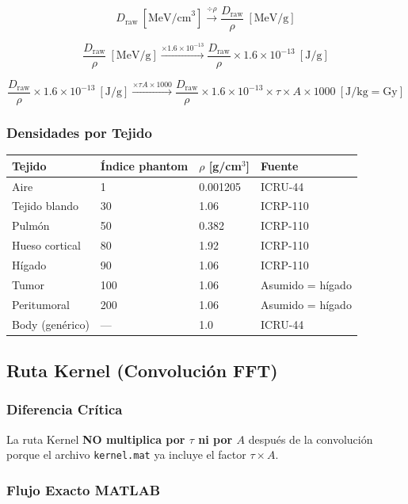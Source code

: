 \documentclass[12pt,a4paper]{article}
\begin{document}
$$D_{\text{raw}}\ [\text{MeV/cm}^3] \xrightarrow{\div \rho} \frac{D_{\text{raw}}}{\rho}\ [\text{MeV/g}]$$

$$\frac{D_{\text{raw}}}{\rho}\ [\text{MeV/g}] \xrightarrow{\times 1.6\times10^{-13}} \frac{D_{\text{raw}}}{\rho} \times 1.6\times10^{-13}\ [\text{J/g}]$$

$$\frac{D_{\text{raw}}}{\rho} \times 1.6\times10^{-13}\ [\text{J/g}] \xrightarrow{\times \tau A \times 1000} \frac{D_{\text{raw}}}{\rho} \times 1.6\times10^{-13} \times \tau \times A \times 1000\ [\text{J/kg} = \text{Gy}]$$

\subsubsection{Densidades por Tejido}

\begin{tabular}{p{4cm} p{3cm} p{2.5cm} p{3cm}}
\toprule
\textbf{Tejido} & \textbf{Índice phantom} & $\rho$ [g/cm$^3$] & \textbf{Fuente} \\
\midrule
Aire & 1 & 0.001205 & ICRU-44 \\
Tejido blando & 30 & 1.06 & ICRP-110 \\
Pulmón & 50 & 0.382 & ICRP-110 \\
Hueso cortical & 80 & 1.92 & ICRP-110 \\
Hígado & 90 & 1.06 & ICRP-110 \\
Tumor & 100 & 1.06 & Asumido = hígado \\
Peritumoral & 200 & 1.06 & Asumido = hígado \\
Body (genérico) & --- & 1.0 & ICRU-44 \\
\bottomrule
\end{tabular}

\subsection{Ruta Kernel (Convolución FFT)}

\subsubsection{Diferencia Crítica}

La ruta Kernel \textbf{NO multiplica por $\tau$ ni por $A$} después de la convolución porque el archivo \texttt{kernel.mat} ya incluye el factor $\tau \times A$.

\subsubsection{Flujo Exacto MATLAB}
\end{document}
